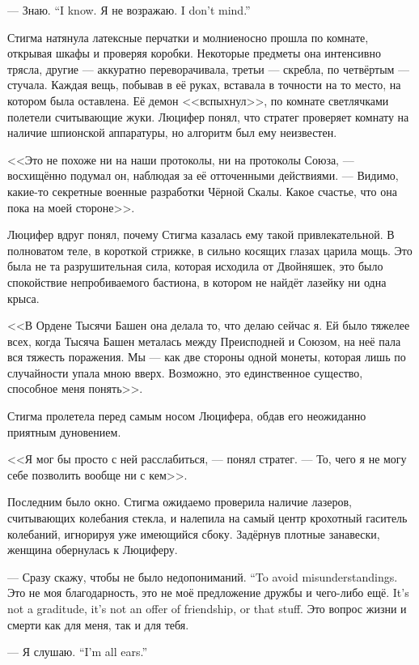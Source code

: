 {--- Знаю.}
{``I know.}
{Я не возражаю.}
{I don't mind.''}

Стигма натянула латексные перчатки и молниеносно прошла по комнате, открывая шкафы и проверяя коробки.
Некоторые предметы она интенсивно трясла, другие --- аккуратно переворачивала, третьи --- скребла, по четвёртым --- стучала.
Каждая вещь, побывав в её руках, вставала в точности на то место, на котором была оставлена.
Её демон <<вспыхнул>>, по комнате светлячками полетели считывающие жуки.
Люцифер понял, что стратег проверяет комнату на наличие шпионской аппаратуры, но алгоритм был ему неизвестен.

<<Это не похоже ни на наши протоколы, ни на протоколы Союза, --- восхищённо подумал он, наблюдая за её отточенными действиями.
--- Видимо, какие-то секретные военные разработки Чёрной Скалы.
Какое счастье, что она пока на моей стороне>>.

Люцифер вдруг понял, почему Стигма казалась ему такой привлекательной.
В полноватом теле, в короткой стрижке, в сильно косящих глазах царила мощь.
Это была не та разрушительная сила, которая исходила от Двойняшек, это было спокойствие непробиваемого бастиона, в котором не найдёт лазейку ни одна крыса.

<<В Ордене Тысячи Башен она делала то, что делаю сейчас я.
Ей было тяжелее всех, когда Тысяча Башен металась между Преисподней и Союзом, на неё пала вся тяжесть поражения.
Мы --- как две стороны одной монеты, которая лишь по случайности упала мною вверх.
Возможно, это единственное существо, способное меня понять>>.

Стигма пролетела перед самым носом Люцифера, обдав его неожиданно приятным дуновением.

<<Я мог бы просто с ней расслабиться, --- понял стратег.
--- То, чего я не могу себе позволить вообще ни с кем>>.

Последним было окно.
Стигма ожидаемо проверила наличие лазеров, считывающих колебания стекла, и налепила на самый центр крохотный гаситель колебаний, игнорируя уже имеющийся сбоку.
Задёрнув плотные занавески, женщина обернулась к Люциферу.

{--- Сразу скажу, чтобы не было недопониманий.}
{``To avoid misunderstandings.}
{Это не моя благодарность, это не моё предложение дружбы и чего-либо ещё.}
{It's not a graditude, it's not an offer of friendship, or that stuff.}
Это вопрос жизни и смерти как для меня, так и для тебя.

{--- Я слушаю.}
{``I'm all ears.''}

